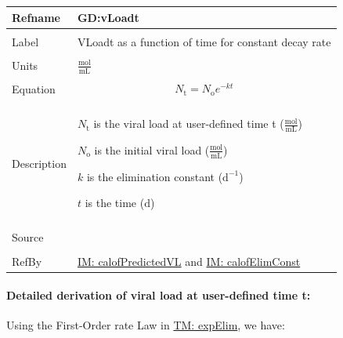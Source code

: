 \documentclass[12pt]{article}
\begin{document}
\vspace{\baselineskip}
\noindent
\begin{minipage}{\textwidth}
\begin{tabular}{>{\raggedright}p{}>{\raggedright\arraybackslash}p{}}
\toprule \textbf{Refname} & \textbf{GD:vLoadt}
\label{GD:vLoadt}
\\ \midrule \\
Label & VLoadt as a function of time for constant decay rate
        
\\ \midrule \\
Units & $\frac{\text{mol}}{\text{mL}}$
        
\\ \midrule \\
Equation & \begin{displaymath}
           {N_{\text{t}}}={N_{\text{o}}} e^{-k t}
           \end{displaymath}
\\ \midrule \\
Description & \begin{symbDescription}
              \item{${N_{\text{t}}}$ is the viral load at user-defined time t ($\frac{\text{mol}}{\text{mL}}$)}
              \item{${N_{\text{o}}}$ is the initial viral load ($\frac{\text{mol}}{\text{mL}}$)}
              \item{$k$ is the elimination constant ($\text{d}^{-1}$)}
              \item{$t$ is the time (${\text{d}}$)}
              \end{symbDescription}
\\ \midrule \\
Source & \cite{hobbie1970}
         
\\ \midrule \\
RefBy & \hyperref[IM:calofPredictedVL]{IM: calofPredictedVL} and \hyperref[IM:calofElimConst]{IM: calofElimConst}
        
\\ \bottomrule
\end{tabular}
\end{minipage}
\paragraph{Detailed derivation of viral load at user-defined time t:}
\label{GD:vLoadtDeriv}
Using the First-Order rate Law in \hyperref[TM:expElim]{TM: expElim}, we have:
\end{document}

